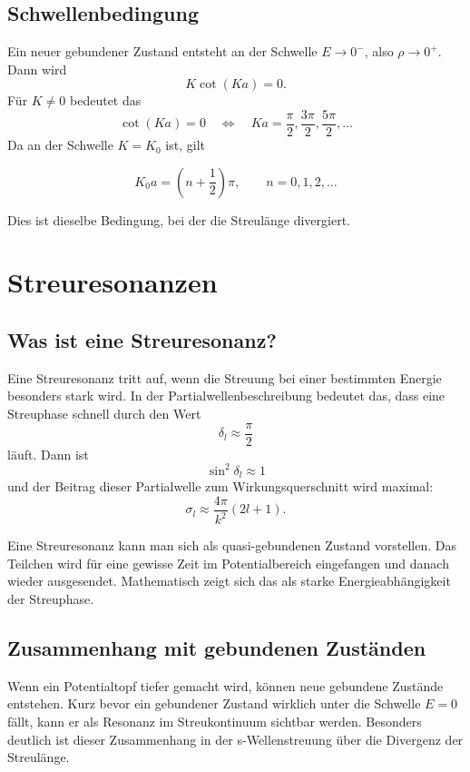 \subsection{Schwellenbedingung}

Ein neuer gebundener Zustand entsteht an der Schwelle \(E\to0^-\), also \(\rho\to0^+\). Dann wird
\[
    K\cot(Ka)=0.
\]
Für \(K\neq0\) bedeutet das
\[
    \cot(Ka)=0
    \quad\Longleftrightarrow\quad
    Ka=\frac{\pi}{2},\frac{3\pi}{2},\frac{5\pi}{2},\dots
\]
Da an der Schwelle \(K=K_0\) ist, gilt
\begin{formulabox}
\[
    K_0a=\left(n+\frac12\right)\pi,
    \qquad n=0,1,2,\dots
\]
\end{formulabox}
Dies ist dieselbe Bedingung, bei der die Streulänge divergiert.

\section{Streuresonanzen}

\subsection{Was ist eine Streuresonanz?}

Eine Streuresonanz tritt auf, wenn die Streuung bei einer bestimmten Energie besonders stark wird. In der Partialwellenbeschreibung bedeutet das, dass eine Streuphase schnell durch den Wert
\[
    \delta_l\approx\frac{\pi}{2}
\]
läuft. Dann ist
\[
    \sin^2\delta_l\approx1
\]
und der Beitrag dieser Partialwelle zum Wirkungsquerschnitt wird maximal:
\[
    \sigma_l\approx\frac{4\pi}{k^2}(2l+1).
\]

\begin{conceptbox}
Eine Streuresonanz kann man sich als quasi-gebundenen Zustand vorstellen. Das Teilchen wird für eine gewisse Zeit im Potentialbereich eingefangen und danach wieder ausgesendet. Mathematisch zeigt sich das als starke Energieabhängigkeit der Streuphase.
\end{conceptbox}

\subsection{Zusammenhang mit gebundenen Zuständen}

Wenn ein Potentialtopf tiefer gemacht wird, können neue gebundene Zustände entstehen. Kurz bevor ein gebundener Zustand wirklich unter die Schwelle \(E=0\) fällt, kann er als Resonanz im Streukontinuum sichtbar werden. Besonders deutlich ist dieser Zusammenhang in der s-Wellenstreuung über die Divergenz der Streulänge.

